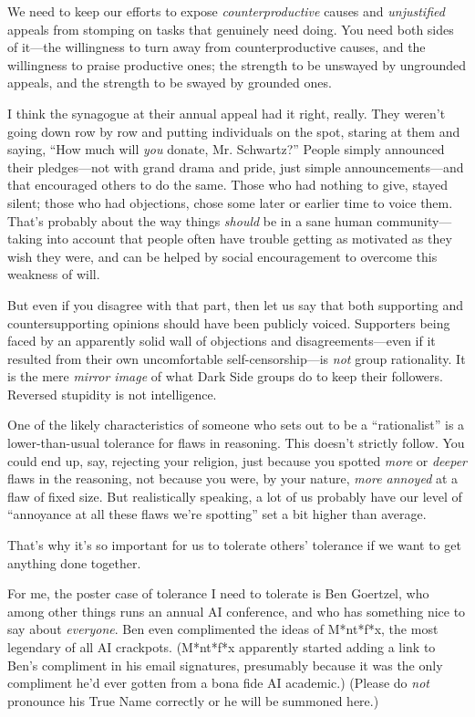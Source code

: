 {
 We need to keep our efforts to expose \textit{counterproductive}
causes and \textit{unjustified} appeals from stomping on tasks that
genuinely need doing. You need both sides of it---the willingness to
turn away from counterproductive causes, and the willingness to praise
productive ones; the strength to be unswayed by ungrounded appeals, and
the strength to be swayed by grounded ones.}

{
 I think the synagogue at their annual appeal had it right, really.
They weren't going down row by row and putting
individuals on the spot, staring at them and saying,
``How much will \textit{you} donate, Mr.
Schwartz?'' People simply announced their
pledges---not with grand drama and pride, just simple
announcements---and that encouraged others to do the same. Those who
had nothing to give, stayed silent; those who had objections, chose
some later or earlier time to voice them. That's
probably about the way things \textit{should} be in a sane human
community---taking into account that people often have trouble getting
as motivated as they wish they were, and can be helped by social
encouragement to overcome this weakness of will.}

{
 But even if you disagree with that part, then let us say that both
supporting and countersupporting opinions should have been publicly
voiced. Supporters being faced by an apparently solid wall of
objections and disagreements---even if it resulted from their own
uncomfortable self-censorship---is \textit{not} group rationality. It
is the mere \textit{mirror image} of what Dark Side groups do to keep
their followers. Reversed stupidity is not intelligence.}

\myendsectiontext


{
 One of the likely characteristics of someone who sets out to be a
``rationalist'' is a
lower-than-usual tolerance for flaws in reasoning. This
doesn't strictly follow. You could end up, say,
rejecting your religion, just because you spotted \textit{more} or
\textit{deeper} flaws in the reasoning, not because you were, by your
nature, \textit{more annoyed} at a flaw of fixed size. But
realistically speaking, a lot of us probably have our level of
``annoyance at all these flaws we're
spotting'' set a bit higher than average. }

{
 That's why it's so important for
us to tolerate others' tolerance if we want to get
anything done together.}

{
 For me, the poster case of tolerance I need to tolerate is Ben
Goertzel, who among other things runs an annual AI conference, and who
has something nice to say about \textit{everyone}. Ben even
complimented the ideas of M*nt*f*x, the most legendary of all AI
crackpots. (M*nt*f*x apparently started adding a link to
Ben's compliment in his email signatures, presumably
because it was the only compliment he'd ever gotten
from a bona fide AI academic.) (Please do \textit{not} pronounce his
True Name correctly or he will be summoned here.)}

